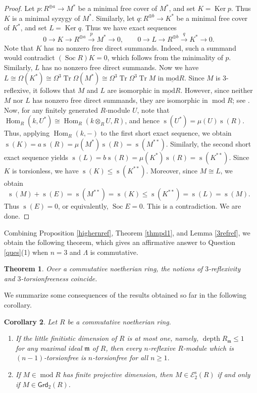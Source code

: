 \documentclass{amsart}
\newtheorem{thm}{Theorem}[section]
\newtheorem{cor}[thm]{Corollary}
\theoremstyle{definition}
\theoremstyle{remark}
\numberwithin{equation}{thm}
\def\depth{\operatorname{depth}}
\def\E{\mathcal{E}}
\def\ge{\geqslant}
\def\grd{\mathsf{Grd}}
\def\Hom{\operatorname{Hom}}
\def\Ker{\operatorname{Ker}}
\def\le{\leqslant}
\def\lmod{\operatorname{\underline{mod}}}
\def\m{\mathfrak{m}}
\def\mod{\operatorname{mod}}
\def\Soc{\operatorname{Soc}}
\def\syz{\Omega}
\def\tr{\operatorname{Tr}}
\begin{document}
\begin{proof}
Let $p:R^{\oplus a}\to M^\ast$ be a minimal free cover of $M^\ast$, and set $K=\Ker p$. Thus $K$ is a minimal syzygy of $M^\ast$.
Similarly, let $q:R^{\oplus b}\to K^\ast$ be a minimal free cover of $K^\ast$, and set $L=\Ker q$.
Thus we have exact sequences
$$
0\to K\to R^{\oplus a}\xrightarrow{p}M^\ast\to0,
\qquad
0\to L\to R^{\oplus b}\xrightarrow{q}K^\ast\to0.
$$
Note that $K$ has no nonzero free direct summands.
Indeed, such a summand would contradict $(\Soc R)K=0$, which follows from the minimality of $p$.
Similarly, $L$ has no nonzero free direct summands.
Now we have $L\cong\syz(K^\ast)\cong\syz^3\tr\syz (M^\ast)\cong\syz^3\tr\syz^3\tr M$ in $\lmod R$.
Since $M$ is $3$-reflexive, it follows that $M$ and $L$ are isomorphic in $\lmod R$.
However, since neither $M$ nor $L$ has nonzero free direct summands, they are isomorphic in $\mod R$; see \cite[Corollary 1.16]{LW}.
Now, for any finitely generated $R$-module $U$, note that $\Hom_R(k,U^\ast)\cong\Hom_R(k\otimes_R U,R)$, and hence $\operatorname{s}(U^\ast)=\mu(U)\operatorname{s}(R)$.
Thus, applying $\Hom_R(k,-)$ to the first short exact sequence, we obtain $\operatorname{s}(K)=a\operatorname{s}(R)=\mu(M^\ast)\operatorname{s}(R)=\operatorname{s}(M^{\ast\ast})$.
Similarly, the second short exact sequence yields $\operatorname{s}(L)=b\operatorname{s}(R)=\mu(K^\ast)\operatorname{s}(R)=\operatorname{s}(K^{\ast\ast})$.
Since $K$ is torsionless, we have $\operatorname{s}(K)\le\operatorname{s}(K^{\ast\ast})$.
Moreover, since $M\cong L$, we obtain
$$
\operatorname{s}(M)+\operatorname{s}(E)=\operatorname{s}(M^{\ast\ast})=\operatorname{s}(K)\le\operatorname{s}(K^{\ast\ast})=\operatorname{s}(L)=\operatorname{s}(M).
$$
Thus $\operatorname{s}(E)=0$, or equivalently, $\Soc E=0$. This is a contradiction. We are done.
\end{proof}

Combining Proposition \ref{highernref}, Theorem \ref{thmpd1}, and Lemma \ref{3refref}, we obtain the following theorem, which gives an affirmative answer to Question \ref{ques}(1) when $n=3$ and $\Lambda$ is commutative.

\begin{thm}\label{3ref3trf}
Over a commutative noetherian ring, the notions of $3$-reflexivity and $3$-torsionfreeness coincide.
\end{thm}

We summarize some consequences of the results obtained so far in the following corollary.

\begin{cor}\label{directcor}
Let $R$ be a commutative noetherian ring.
\begin{enumerate}[\rm(1)]
   \item If the little finitistic dimension of $R$ is at most one, namely, $\depth R_\m\le 1$ for any maximal ideal $\m$ of $R$, then every $n$-reflexive $R$-module which is $(n-1)$-torsionfree is $n$-torsionfree for all $n\ge1$.
   \item If $M\in\mod R$ has finite projective dimension, then $M\in\E_2^{\mathrm{s}}(R)$ if and only if $M\in\grd_2(R)$.
\end{enumerate}
\end{cor}
\end{document}
